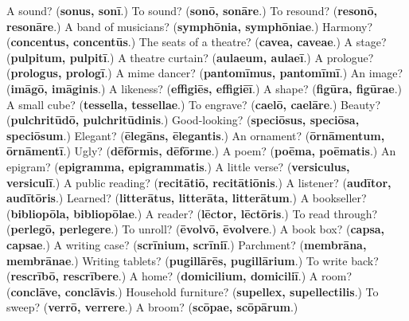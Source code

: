 \begin{tcolorbox}[breakable,colback=teal!4,colframe=teal!35!black,title={Before you move on}]
A sound? (\textbf{sonus, sonī}.) To sound? (\textbf{sonō, sonāre}.) To resound? (\textbf{resonō, resonāre}.) A band of musicians? (\textbf{symphōnia, symphōniae}.) Harmony? (\textbf{concentus, concentūs}.) The seats of a theatre? (\textbf{cavea, caveae}.) A stage? (\textbf{pulpitum, pulpitī}.) A theatre curtain? (\textbf{aulaeum, aulaeī}.) A prologue? (\textbf{prologus, prologī}.) A mime dancer? (\textbf{pantomīmus, pantomīmī}.) An image? (\textbf{imāgō, imāginis}.) A likeness? (\textbf{effigiēs, effigiēī}.) A shape? (\textbf{figūra, figūrae}.) A small cube? (\textbf{tessella, tessellae}.) To engrave? (\textbf{caelō, caelāre}.) Beauty? (\textbf{pulchritūdō, pulchritūdinis}.) Good-looking? (\textbf{speciōsus, speciōsa, speciōsum}.) Elegant? (\textbf{ēlegāns, ēlegantis}.) An ornament? (\textbf{ōrnāmentum, ōrnāmentī}.) Ugly? (\textbf{dēfōrmis, dēfōrme}.) A poem? (\textbf{poēma, poēmatis}.) An epigram? (\textbf{epigramma, epigrammatis}.) A little verse? (\textbf{versiculus, versiculī}.) A public reading? (\textbf{recitātiō, recitātiōnis}.) A listener? (\textbf{audītor, audītōris}.) Learned? (\textbf{litterātus, litterāta, litterātum}.) A bookseller? (\textbf{bibliopōla, bibliopōlae}.) A reader? (\textbf{lēctor, lēctōris}.) To read through? (\textbf{perlegō, perlegere}.) To unroll? (\textbf{ēvolvō, ēvolvere}.) A book box? (\textbf{capsa, capsae}.) A writing case? (\textbf{scrīnium, scrīniī}.) Parchment? (\textbf{membrāna, membrānae}.) Writing tablets? (\textbf{pugillārēs, pugillārium}.) To write back? (\textbf{rescrībō, rescrībere}.) A home? (\textbf{domicilium, domiciliī}.) A room? (\textbf{conclāve, conclāvis}.) Household furniture? (\textbf{supellex, supellectilis}.) To sweep? (\textbf{verrō, verrere}.) A broom? (\textbf{scōpae, scōpārum}.)
\end{tcolorbox}
